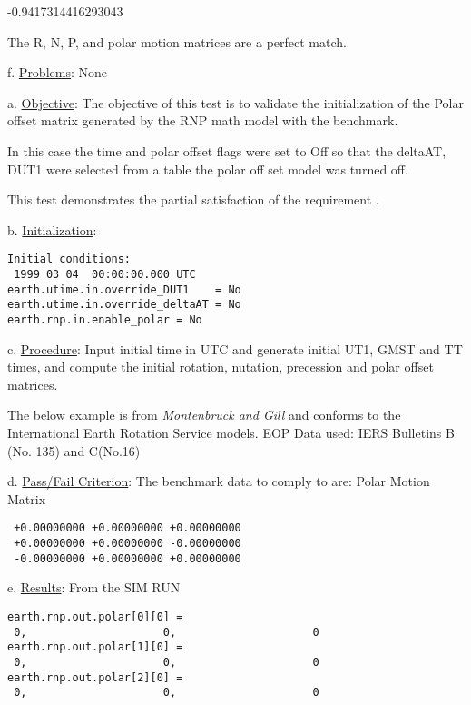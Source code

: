  -0.9417314416293043


The R, N, P, and polar motion matrices are a
perfect match.\newline

f. \underline{Problems}:\newline
None


     \label{test:rnp_test4}

a. \underline{Objective}:\newline
The objective of this test is to validate the initialization of the Polar
offset matrix generated by the RNP math model with the benchmark.

In this case the time and polar offset flags were set to Off so that the
deltaAT, DUT1 were selected from a table the polar off set model was
turned off.\newline

This test demonstrates the partial satisfaction
of the requirement .

b. \underline{Initialization}:
\begin{verbatim}
Initial conditions:
 1999 03 04  00:00:00.000 UTC
earth.utime.in.override_DUT1    = No
earth.utime.in.override_deltaAT = No
earth.rnp.in.enable_polar = No
\end{verbatim}

c. \underline{Procedure}:\newline
Input initial time in UTC and generate initial UT1, GMST and TT times,
and compute the initial rotation, nutation,
precession and polar offset matrices.

The below example is from {\em Montenbruck and Gill} \cite{MG}
and conforms to the International Earth Rotation Service models.
EOP Data used: IERS Bulletins B (No. 135) and C(No.16)\newline

d. \underline{Pass/Fail Criterion}:\newline
The benchmark data to comply to are:
Polar Motion Matrix
\begin{verbatim}
 +0.00000000 +0.00000000 +0.00000000
 +0.00000000 +0.00000000 -0.00000000
 -0.00000000 +0.00000000 +0.00000000
\end{verbatim}

e. \underline{Results}:\newline
From the SIM RUN
\begin{verbatim}
earth.rnp.out.polar[0][0] =
 0,                     0,                     0
earth.rnp.out.polar[1][0] =
 0,                     0,                     0
earth.rnp.out.polar[2][0] =
 0,                     0,                     0
\end{verbatim}

